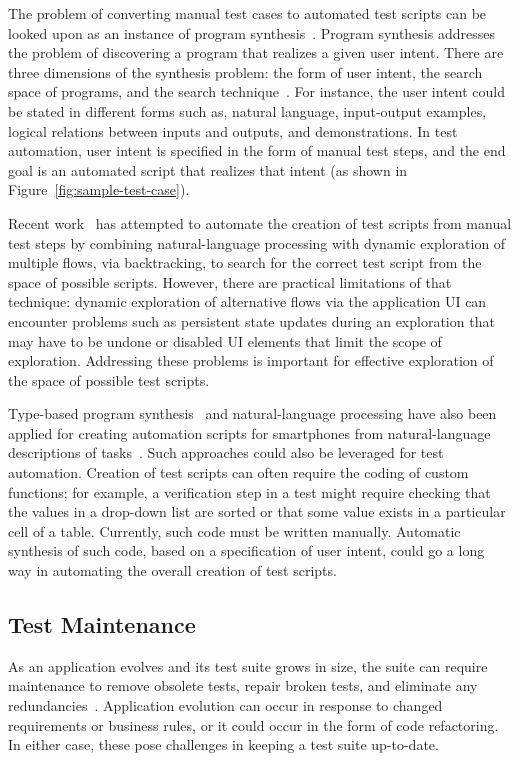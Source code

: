 The problem of converting manual test cases to automated test scripts can be
looked upon as an instance of program synthesis~\cite{Gulwani:2010}.  Program
synthesis addresses the problem of discovering a program that realizes a given
user intent. There are three dimensions of the synthesis problem: the form of
user intent, the search space of programs, and the search
technique~\cite{Gulwani:2010}. For instance, the user intent could be stated in
different forms such as, natural language, input-output examples, logical
relations between inputs and outputs, and demonstrations. In test automation,
user intent is specified in the form of manual test steps, and the end goal is
an automated script that realizes that intent (\eg as shown in
Figure~\ref{fig:sample-test-case}).

Recent work~\cite{thummalapenta:2012a} has attempted to automate the creation of
test scripts from manual test steps by combining natural-language processing
with dynamic exploration of multiple flows, via backtracking, to search for the
correct test script from the space of possible scripts. However, there are
practical limitations of that technique: dynamic exploration of alternative
flows via the application UI can encounter problems such as persistent state
updates during an exploration that may have to be undone or disabled UI elements
that limit the scope of exploration. Addressing these problems is important for
effective exploration of the space of possible test scripts.

Type-based program synthesis~\cite{Perelman:2012} and natural-language
processing have also been applied for creating automation scripts for
smartphones from natural-language descriptions of tasks~\cite{Le:2013}. Such
approaches could also be leveraged for test automation. Creation of test scripts
can often require the coding of custom functions; for example, a verification
step in a test might require checking that the values in a drop-down list are
sorted or that some value exists in a particular cell of a table. Currently,
such code must be written manually. Automatic synthesis of such code, based on a
specification of user intent, could go a long way in automating the overall
creation of test scripts.

\subsection{Test Maintenance}
\label{sec:test-maintenance}

As an application evolves and its test suite grows in size, the suite can
require maintenance to remove obsolete tests, repair broken tests, and eliminate
any redundancies~\cite{Pinto:2012}.  Application evolution can occur in response
to changed requirements or business rules, or it could occur in the form of code
refactoring. In either case, these pose challenges in keeping a test suite
up-to-date.

